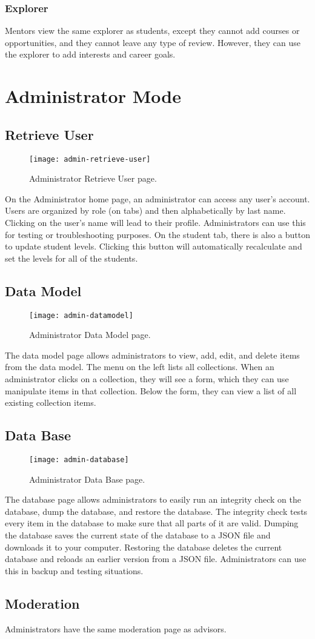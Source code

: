 \subsubsection{Explorer}
Mentors view the same explorer as students, except they cannot add courses or opportunities, and they cannot leave any type of review. However, they can use the explorer to add interests and career goals.

\section{Administrator Mode}
\subsection{Retrieve User}
\begin{figure}[h]
\centering
\texttt{[image: admin-retrieve-user]}
\caption{Administrator Retrieve User page.}
\end{figure}
On the Administrator home page, an administrator can access any user's account. Users are organized by role (on tabs) and then alphabetically by last name. Clicking on the user's name will lead to their profile. Administrators can use this for testing or troubleshooting purposes. On the student tab, there is also a button to update student levels. Clicking this button will automatically recalculate and set the levels for all of the students.

\subsection{Data Model}
\begin{figure}[h]
\centering
\texttt{[image: admin-datamodel]}
\caption{Administrator Data Model page.}
\end{figure}
The data model page allows administrators to view, add, edit, and delete items from the data model. The menu on the left lists all collections. When an administrator clicks on a collection, they will see a form, which they can use manipulate items in that collection. Below the form, they can view a list of all existing collection items. 
\subsection{Data Base}
\begin{figure}[h]
\centering
\texttt{[image: admin-database]}
\caption{Administrator Data Base page.}
\end{figure}
The database page allows administrators to easily run an integrity check on the database, dump the database, and restore the database. The integrity check tests every item in the database to make sure that all parts of it are valid. Dumping the database saves the current state of the database to a JSON file and downloads it to your computer. Restoring the database deletes the current database and reloads an earlier version from a JSON file. Administrators can use this in backup and testing situations.
\subsection{Moderation}
Administrators have the same moderation page as advisors. 